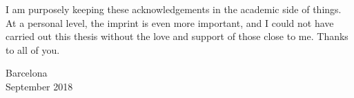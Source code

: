 \documentclass[10pt,a4paper,twoside,fleqn,showtrims]{memoir}
\begin{document}
I am purposely keeping these acknowledgements in the academic side of things. At a personal level, the imprint is even more important, and I could not have carried out this thesis without the love and support of those close to me. Thanks to all of you.

\begin{flushright}
Barcelona\\
September 2018
\end{flushright}

\cleartoverso %

\end{document}
